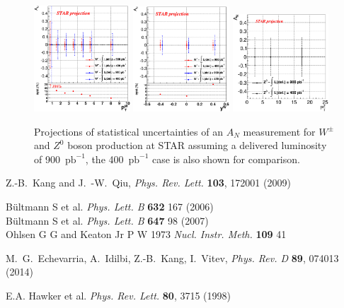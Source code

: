 \documentclass{PoS}
\begin{document}
\begin{figure}[htbp]
  \centering
  \includegraphics[width=0.32\textwidth]{hd_WAsym2016ProjPt_zoom.eps}
  \includegraphics[width=0.32\textwidth]{hd_WAsym2016ProjRap_zoom.eps}
  \includegraphics[width=0.32\textwidth]{hd_Z0Asym2016ProjPt.eps}
  \caption{Projections of statistical uncertainties of an $A_{N}$ measurement for  $W^{\pm}$ and $Z^{0}$ boson production at STAR assuming a delivered luminosity of 900~$\text{pb}^{-1}$, the 400~$\text{pb}^{-1}$ case is also shown for comparison.}
  \label{Fig:Run16Proj}
\end{figure}

\begin{thebibliography}{99}

  Z.-B.~Kang and J.~-W.~Qiu,
  {\it Phys. Rev. Lett.}  {\bf 103}, 172001 (2009)

B\"{u}ltmann S et al. {\it Phys. Lett. B} {\bf 632} 167 (2006)\\
B\"{u}ltmann S et al. {\it Phys. Lett. B} {\bf 647} 98 (2007)\\
Ohlsen G G and Keaton Jr P W 1973 {\it Nucl. Instr. Meth.} {\bf 109} 41

M.~G.~Echevarria, A.~Idilbi, Z.-B.~Kang, I.~Vitev,
{\it Phys. Rev. D} {\bf 89}, 074013 (2014)

E.A. Hawker et al. {\it Phys. Rev. Lett.} {\bf 80}, 3715 (1998)

\end{thebibliography}
\end{document}
